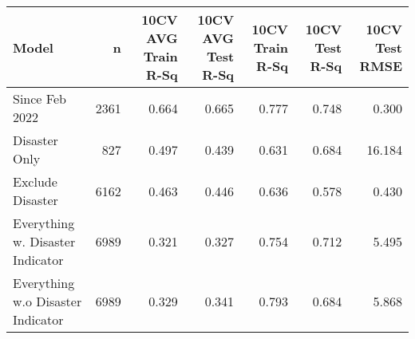 
\begin{tabular}{l|r|r|r|r|r|r}
\hline
Model & n & 10CV AVG Train R-Sq & 10CV AVG Test R-Sq & 10CV Train R-Sq & 10CV Test R-Sq & 10CV Test RMSE\\
\hline
Since Feb 2022 & 2361 & 0.664 & 0.665 & 0.777 & 0.748 & 0.300\\
\hline
Disaster Only & 827 & 0.497 & 0.439 & 0.631 & 0.684 & 16.184\\
\hline
Exclude Disaster & 6162 & 0.463 & 0.446 & 0.636 & 0.578 & 0.430\\
\hline
Everything w. Disaster Indicator & 6989 & 0.321 & 0.327 & 0.754 & 0.712 & 5.495\\
\hline
Everything w.o Disaster Indicator & 6989 & 0.329 & 0.341 & 0.793 & 0.684 & 5.868\\
\hline
\end{tabular}
